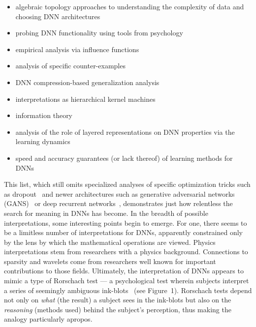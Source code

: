 \documentclass[11pt,lettersize]{article}
\begin{document}
\begin{itemize}
    \item algebraic topology approaches to understanding the complexity of data and choosing DNN architectures~\cite{guss2018characterizing}
    \item probing DNN functionality using tools from psychology~\cite{ritter2017cognitive}
    \item empirical analysis via influence functions~\cite{koh2017understanding}
    \item analysis of specific counter-examples~\cite{safran2017depth,safran2017spurious}
    \item DNN compression-based generalization analysis~\cite{arora2018stronger}
    \item interpretations as hierarchical kernel machines~\cite{anselmi2015deep}
    \item information theory~\cite{yu2018understanding}
    \item analysis of the role of layered representations on DNN properties via the learning dynamics~\cite{haeffele2015global,sagun2017empirical,shalev2017failures,safran2016quality,saxe2013exact}
    \item speed and accuracy guarantees (or lack thereof) of learning methods for DNNs~\cite{arora2014provable,pascanu2014saddle,dauphin2014identifying,arora2016provable,wilson2017marginal,arora2018optimization,kidambi2018insufficiency}  
\end{itemize}

This list, which still omits specialized analyses of specific optimization tricks such as dropout~\cite{gal2015dropout} and newer architectures such as generative adversarial networks (GANS)~\cite{arora2017generalization,arora2017gans} or deep recurrent networks~\cite{levine2017benefits}, demonstrates just how relentless the search for meaning in DNNs has become. In the breadth of possible interpretations, some interesting points begin to emerge. For one, there seems to be a limitless number of interpretations for DNNs, apparently constrained only by the lens by which the mathematical operations are viewed. Physics interpretations stem from researchers with a physics background. Connections to sparsity and wavelets come from researchers well known for important contributions to those fields. 
Ultimately, the interpretation of DNNs appears to mimic a type of Rorschach test --- a psychological test wherein subjects interpret a series of seemingly ambiguous ink-blots~\cite{rorschach1922psychodiagnostik} (see Figure~1). Rorschach tests depend not only on \emph{what} (the result) a subject sees in the ink-blots but also on the \emph{reasoning} (methods used) behind the subject's perception, thus making the analogy particularly apropos. 
\end{document}
